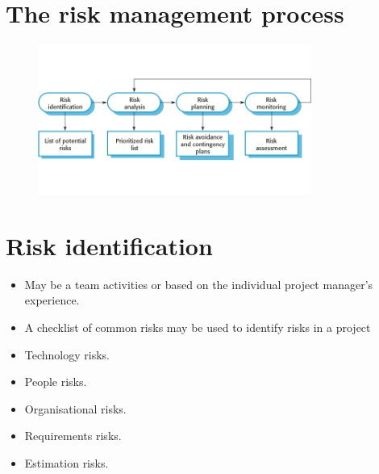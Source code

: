 \section{ The risk management process}
\begin{figure}[h!]
    \centering
    \includegraphics[width = 0.8\textwidth]{./figures/L5_1.png}
    \caption{}
    \label{fig:L5_1}
\end{figure}


\section{ Risk identification}
\begin{itemize}

\item May be a team activities or based on the individual project manager’s experience.

\item A checklist of common risks may be used to identify risks in a project

  \item Technology risks.   \item People risks.   \item Organisational risks.   \item Requirements risks.   \item Estimation risks.

\end{itemize}
\newpage
